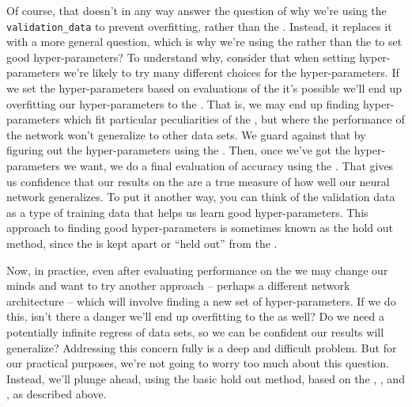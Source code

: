 \documentclass[a4paper,twoside,10pt]{book}
\begin{document}
Of course, that doesn't in any way answer the question of why we're using the \texttt{validation\_data} to prevent overfitting, rather than the . Instead, it replaces it with a more general question, which is why we're using the  rather than the  to set good hyper-parameters? To understand why, consider that when setting hyper-parameters we're likely to try many different choices for the hyper-parameters. If we set the hyper-parameters based on evaluations of the  it's possible we'll end up overfitting our hyper-parameters to the . That is, we may end up finding hyper-parameters which fit particular peculiarities of the , but where the performance of the network won't generalize to other data sets. We guard against that by figuring out the hyper-parameters using the . Then, once we've got the hyper-parameters we want, we do a final evaluation of accuracy using the . That gives us confidence that our results on the  are a true measure of how well our neural network generalizes. To put it another way, you can think of the validation data as a type of training data that helps us learn good hyper-parameters. This approach to finding good hyper-parameters is sometimes known as the hold out method, since the  is kept apart or ``held out'' from the .

Now, in practice, even after evaluating performance on the  we may change our minds and want to try another approach -- perhaps a different network architecture -- which will involve finding a new set of hyper-parameters. If we do this, isn't there a danger we'll end up overfitting to the  as well? Do we need a potentially infinite regress of data sets, so we can be confident our results will generalize? Addressing this concern fully is a deep and difficult problem. But for our practical purposes, we're not going to worry too much about this question. Instead, we'll plunge ahead, using the basic hold out method, based on the , , and , as described above.
\end{document}

